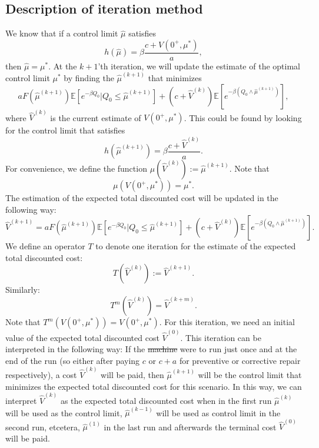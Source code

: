 \documentclass[a4paper]{thesis}
\theoremstyle{definition}
\providecommand{\DIFaddtex}[1]{{\protect\color{blue}\uwave{#1}}} %
\providecommand{\DIFdeltex}[1]{{\protect\color{red}\sout{#1}}}                      %
\providecommand{\DIFaddbegin}{} %
\providecommand{\DIFaddend}{} %
\providecommand{\DIFdelbegin}{} %
\providecommand{\DIFdelend}{} %
\providecommand{\DIFadd}[1]{\texorpdfstring{\DIFaddtex{#1}}{#1}} %
\providecommand{\DIFdel}[1]{\texorpdfstring{\DIFdeltex{#1}}{}} %
\newcommand{\DIFscaledelfig}{0.5}
\newlength{\DIFdelgraphicswidth} %
\newlength{\DIFdelgraphicsheight} %
\newcommand{\DIFaddincludegraphics}[2][]{{\color{blue}\fbox{\DIFOincludegraphics[#1]{#2}}}} %
\newcommand{\DIFdelincludegraphics}[2][]{%
	\sbox{\DIFdelgraphicsbox}{\DIFOincludegraphics[#1]{#2}}%
	\settoboxwidth{\DIFdelgraphicswidth}{\DIFdelgraphicsbox} %
	\settoboxtotalheight{\DIFdelgraphicsheight}{\DIFdelgraphicsbox} %
	\scalebox{\DIFscaledelfig}{%
		\parbox[b]{\DIFdelgraphicswidth}{\usebox{\DIFdelgraphicsbox}\\[-\baselineskip] \rule{\DIFdelgraphicswidth}{0em}}\llap{\resizebox{\DIFdelgraphicswidth}{\DIFdelgraphicsheight}{%
				\setlength{\unitlength}{\DIFdelgraphicswidth}%
				\begin{picture}(1,1)%
				\thicklines\linethickness{2pt} %
				{\color[rgb]{1,0,0}\put(0,0){\framebox(1,1){}}}%
				{\color[rgb]{1,0,0}\put(0,0){\line( 1,1){1}}}%
				{\color[rgb]{1,0,0}\put(0,1){\line(1,-1){1}}}%
				\end{picture}%
			}\hspace*{3pt}}} %
} %
\DeclareRobustCommand{\DIFaddbegin}{\DIFOaddbegin \let\includegraphics\DIFaddincludegraphics} %
\DeclareRobustCommand{\DIFaddend}{\DIFOaddend \let\includegraphics\DIFOincludegraphics} %
\DeclareRobustCommand{\DIFdelbegin}{\DIFOdelbegin \let\includegraphics\DIFdelincludegraphics} %
\DeclareRobustCommand{\DIFdelend}{\DIFOaddend \let\includegraphics\DIFOincludegraphics} %
\begin{document}
	\subsection{Description of iteration method}\label{section:AgeBasedIterationDescription}
	We know that if a control limit $\hat{\mu}$ satisfies
	\[h(\hat{\mu})=\beta\frac{c+V(0^+,\mu^*)}{a},\]
	then $\hat{\mu}=\mu^*$.
	At the $k+1$'th iteration, we will update the estimate of the optimal control limit $\mu^*$ by finding the $\hat{\mu}^{(k+1)}$ that minimizes
	\[
	aF(\hat{\mu}^{(k+1)})\mathbb{E}[e^{-\beta Q_0}|Q_0\leq \hat{\mu}^{(k+1)}]+(c+\hat{V}^{(k)})\mathbb{E}[e^{-\beta(Q_0\wedge\hat{\mu}^{(k+1)})}],
	\]
	where $\hat{V}^{(k)}$ is the current estimate of $V(0^+,\mu^*)$.
	This could be found by looking for the control limit that satisfies
	\begin{equation}\label{eq:AgeBasedIterationBound}
	h(\hat{\mu}^{(k+1)})=\beta\frac{c+\hat{V}^{(k)}}{a}.\end{equation}
	For convenience, we define the function $\mu(\hat{V}^{(k)}):=\hat{\mu}^{(k+1)}$.
	Note that \DIFaddbegin \DIFadd{by lemma \ref{lemma:AgeBasedControlLimit}
	}\DIFaddend \begin{equation}\label{eq:AgeBasedIterationControlConvergence}
	\mu(V(0^+,\mu^*))=\mu^*.
	\end{equation}
	The estimation of the expected total discounted cost will be updated in the following way:
	\[\hat{V}^{(k+1)}=aF(\hat{\mu}^{(k+1)})\mathbb{E}[e^{-\beta Q_0}|Q_0\leq \hat{\mu}^{(k+1)}]+(c+\hat{V}^{(k)})\mathbb{E}[e^{-\beta(Q_0\wedge\hat{\mu}^{(k+1)})}].\]
	We define an operator $T$ to denote one iteration for the estimate of the expected total discounted cost:
	\[T(\hat{V}^{(k)}):=\hat{V}^{(k+1)}.\]
	Similarly:
	\[T^m(\hat{V}^{(k)})=\hat{V}^{(k+m)}.\]
	Note that $T^m(V(0^+,\mu^*))=V(0^+,\mu^*)$.
	For this iteration, we need an initial value of the expected total discounted cost $\hat{V}^{(0)}$.
	This iteration can be interpreted in the following way:
	If the \DIFdelbegin \DIFdel{machine }\DIFdelend \DIFaddbegin \DIFadd{asset }\DIFaddend were to run just once and at the end of the run (so either after paying $c$ or $c+a$ for preventive or corrective repair respectively), a cost $\hat{V}^{(k)}$ will be paid, then $\hat{\mu}^{(k+1)}$ will be the control limit that minimizes the expected total discounted cost for this scenario.
	In this way, we can interpret $\hat{V}^{(k)}$ as the expected total discounted cost when in the first run $\hat{\mu}^{(k)}$ will be used as the control limit, $\hat{\mu}^{(k-1)}$ will be used as control limit in the second run, etcetera, $\hat{\mu}^{(1)}$ in the last run and afterwards the terminal cost $\hat{V}^{(0)}$ will be paid.
	
\end{document}
